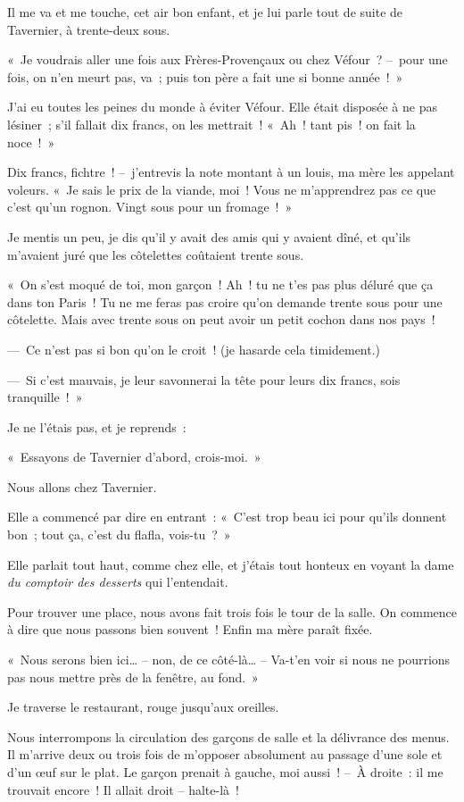 \documentclass[french,twoside]{book} %
\begin{document}
Il me va et me touche, cet air bon enfant, et je lui parle tout de suite de Tavernier, à trente-deux sous.\par
« Je voudrais aller une fois aux Frères-Provençaux ou chez Véfour ? – pour une fois, on n’en meurt pas, va ; puis ton père a fait une si bonne année ! »\par
J’ai eu toutes les peines du monde à éviter Véfour. Elle était disposée à ne pas lésiner ; s’il fallait dix francs, on les mettrait ! « Ah ! tant pis ! on fait la noce ! »\par
Dix francs, fichtre ! – j’entrevis la note montant à un louis, ma mère les appelant voleurs. « Je sais le prix de la viande, moi ! Vous ne m’apprendrez pas ce que c’est qu’un rognon. Vingt sous pour un fromage ! »\par
Je mentis un peu, je dis qu’il y avait des amis qui y avaient dîné, et qu’ils m’avaient juré que les côtelettes coûtaient trente sous.\par
« On s’est moqué de toi, mon garçon ! Ah ! tu ne t’es pas plus déluré que ça dans ton Paris ! Tu ne me feras pas croire qu’on demande trente sous pour une côtelette. Mais avec trente sous on peut avoir un petit cochon dans nos pays !\par
— Ce n’est pas si bon qu’on le croit ! (je hasarde cela timidement.)\par
— Si c’est mauvais, je leur savonnerai la tête pour leurs dix francs, sois tranquille ! »\par
Je ne l’étais pas, et je reprends :\par
« Essayons de Tavernier d’abord, crois-moi. »\par
Nous allons chez Tavernier.\par
\bigbreak
\noindent Elle a commencé par dire en entrant : « C’est trop beau ici pour qu’ils donnent bon ; tout ça, c’est du flafla, vois-tu ? »\par
Elle parlait tout haut, comme chez elle, et j’étais tout honteux en voyant la dame \emph{du comptoir des desserts} qui l’entendait.\par
Pour trouver une place, nous avons fait trois fois le tour de la salle. On commence à dire que nous passons bien souvent ! Enfin ma mère paraît fixée.\par
« Nous serons bien ici… – non, de ce côté-là… – Va-t’en voir si nous ne pourrions pas nous mettre près de la fenêtre, au fond. »\par
Je traverse le restaurant, rouge jusqu’aux oreilles.\par
Nous interrompons la circulation des garçons de salle et la délivrance des menus. Il m’arrive deux ou trois fois de m’opposer absolument au passage d’une sole et d’un œuf sur le plat. Le garçon prenait à gauche, moi aussi ! – À droite : il me trouvait encore ! Il allait droit – halte-là !\par
\end{document}
